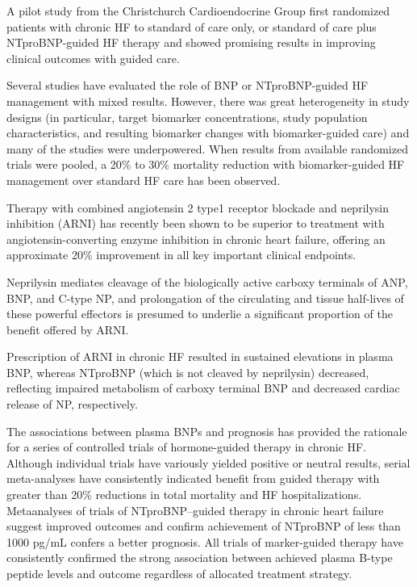 \documentclass[14pt,a4paper,onecolumn]{extarticle}
\begin{document}
A pilot study from the Christchurch Cardioendocrine Group first randomized patients with chronic HF to standard of care only, or standard of care plus NTproBNP-guided HF therapy and showed promising results in improving clinical outcomes with guided care. \citep{Troughton2000}

Several studies have evaluated the role of BNP or NTproBNP-guided HF management with mixed results. However, there was great heterogeneity in study designs (in particular, target biomarker concentrations, study population characteristics, and resulting biomarker changes with biomarker-guided care) and many of the studies were underpowered. When results from available randomized trials were pooled, a 20\% to 30\% mortality reduction with biomarker-guided HF management over standard HF care has been observed. \citep{Porapakkham2010}

Therapy with combined angiotensin 2 type1 receptor blockade and neprilysin inhibition (ARNI) has recently been shown to be superior to treatment with angiotensin-converting enzyme inhibition in chronic heart failure, offering an approximate 20\% improvement in all key important clinical endpoints. \citep{McMurray2014}

Neprilysin mediates cleavage of the biologically active carboxy terminals of ANP, BNP, and C-type NP, and prolongation of the circulating and tissue half-lives of these powerful effectors is presumed to underlie a significant proportion of the benefit offered by ARNI. \citep{Bayes-Genis2016}

Prescription of ARNI in chronic HF resulted in sustained elevations in plasma BNP, whereas NTproBNP (which is not cleaved by neprilysin) decreased, reflecting impaired metabolism of carboxy terminal BNP and decreased cardiac release of NP, respectively. \citep{Packer2015}

The associations between plasma BNPs and prognosis has provided the rationale for a series of controlled trials of hormone-guided therapy in chronic HF. Although individual trials have variously yielded positive or neutral results, serial meta-analyses have consistently indicated benefit from guided therapy with greater than 20\% reductions in total mortality and HF hospitalizations. Metaanalyses of trials of NTproBNP–guided therapy in chronic heart failure suggest improved outcomes and confirm achievement of NTproBNP of less than 1000 pg/mL confers a better prognosis. All trials of marker-guided therapy have consistently confirmed the strong association between achieved plasma B-type  peptide levels and outcome regardless of allocated treatment strategy. \citep{Troughton2014}
\end{document}
